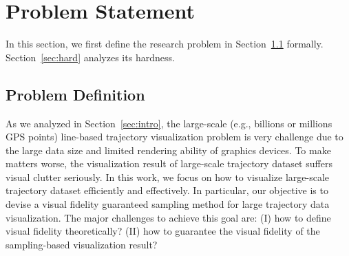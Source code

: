 \section{Problem Statement}\label{sec:pro}
In this section, we first define the research problem in Section~\ref{sec:def} formally.
Section~\ref{sec:hard} analyzes its hardness.
%


\subsection{Problem Definition}\label{sec:def}
As we analyzed in Section~\ref{sec:intro}, the large-scale (e.g., billions or millions GPS points) line-based trajectory visualization problem is very challenge due to the large data size and limited rendering ability of graphics devices.
To make matters worse, the visualization result of large-scale trajectory dataset suffers visual clutter seriously.
In this work, we focus on how to visualize large-scale trajectory dataset efficiently and effectively.
In particular, our objective is to devise a visual fidelity guaranteed sampling method for large trajectory data visualization.
The major challenges to achieve this goal are:
(I) how to define visual fidelity theoretically? (II) how to guarantee the visual fidelity of the sampling-based visualization result?

